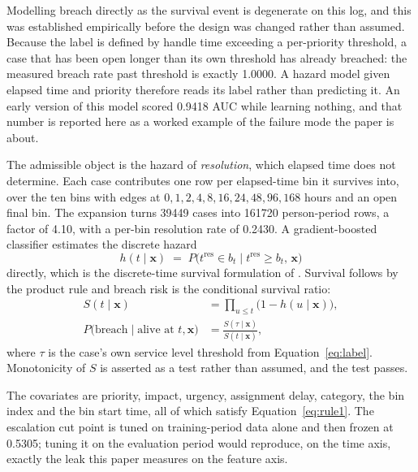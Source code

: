 Modelling breach directly as the survival event is degenerate on this log, and this was
established empirically before the design was changed rather than assumed. Because the label is
defined by handle time exceeding a per-priority threshold, a case that has been open longer than
its own threshold has already breached: the measured breach rate past threshold is exactly
\num{1.0000}. A hazard model given elapsed time and priority therefore reads its label rather
than predicting it. An early version of this model scored \num{0.9418} AUC while learning
nothing, and that number is reported here as a worked example of the failure mode the paper is
about.

The admissible object is the hazard of \emph{resolution}, which elapsed time does not determine.
Each case contributes one row per elapsed-time bin it survives into, over the ten bins with
edges at $0, 1, 2, 4, 8, 16, 24, 48, 96, 168$ hours and an open final bin. The expansion turns
\num{39449} cases into \num{161720} person-period rows, a factor of \num{4.10}, with a per-bin
resolution rate of \num{0.2430}. A gradient-boosted classifier estimates the discrete hazard
\begin{equation}
h(t \mid \mathbf{x}) \;=\; P\bigl(t^{\mathrm{res}} \in b_t \;\big|\; t^{\mathrm{res}} \ge b_t,\, \mathbf{x}\bigr)
\label{eq:hazard}
\end{equation}
directly, which is the discrete-time survival formulation of \citet{suresh2022survival}.
Survival follows by the product rule and breach risk is the conditional survival ratio:
\begin{align}
S(t \mid \mathbf{x}) &= \prod_{u \le t} \bigl(1 - h(u \mid \mathbf{x})\bigr),
\label{eq:surv}\\[2pt]
P\bigl(\text{breach} \mid \text{alive at } t, \mathbf{x}\bigr)
  &= \frac{S(\tau \mid \mathbf{x})}{S(t \mid \mathbf{x})},
\label{eq:survival}
\end{align}
where $\tau$ is the case's own service level threshold from Equation~\ref{eq:label}. Monotonicity
of $S$ is asserted as a test rather than assumed, and the test passes.

The covariates are priority, impact, urgency, assignment delay, category, the bin index and the
bin start time, all of which satisfy Equation~\ref{eq:rule1}. The escalation cut point is tuned
on training-period data alone and then frozen at \num{0.5305}; tuning it on the evaluation
period would reproduce, on the time axis, exactly the leak this paper measures on the feature
axis.

